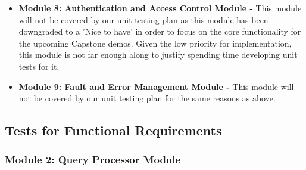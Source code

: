 \documentclass[12pt, titlepage]{article}
\begin{document}
\begin{flushleft}
\begin{itemize}
  in our system and thus testing on it is not currently possible so it will also be omitted.
  \item \textbf{Module 8: Authentication and Access Control Module -} This module will not be covered by
  our unit testing plan as this module has been downgraded to a 'Nice to have' in order to focus on the core functionality
  for the upcoming Capstone demos. Given the low priority for implementation, this module is not far enough along
  to justify spending time developing unit tests for it.
  \item \textbf{Module 9: Fault and Error Management Module -} This module will not be covered by
  our unit testing plan for the same reasons as above.
\end{itemize}

\subsection{Tests for Functional Requirements}


\subsubsection{Module 2: Query Processor Module}


\end{flushleft}
\end{document}
